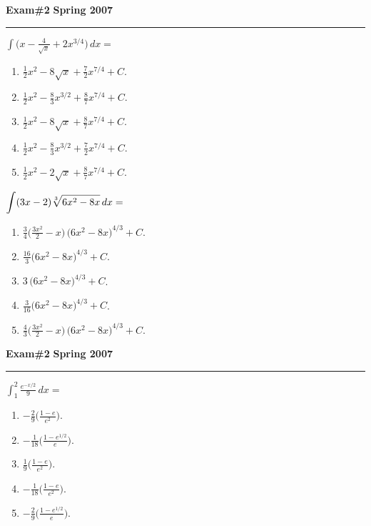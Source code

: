 \documentclass[12pt]{article}
\begin{document}
\hfill{\large\bf Exam\#2}\hfill{\large\bf
  Spring 2007}\hrule 
\bigskip

{\problem $\int \big( x - \frac{4}{\sqrt{x}} + 2x^{3/4}
    \big)\, dx = $} 
\begin{enumerate}
\item $\frac{1}{2}x^2 - 8\sqrt{x} + \frac{7}{2} x^{7/4} + C$.
\item $\frac{1}{2}x^2 - \frac{8}{3}x^{3/2} + \frac{8}{7} x^{7/4} + C$.
\item $\frac{1}{2}x^2 - 8\sqrt{x} + \frac{8}{7} x^{7/4} + C$.
\item $\frac{1}{2}x^2 - \frac{8}{3}x^{3/2} + \frac{7}{2} x^{7/4} + C$.
\item $\frac{1}{2}x^2 - 2\sqrt{x} + \frac{8}{7} x^{7/4} + C$.
\end{enumerate}
\vspace{5cm}

{\problem $\displaystyle{\int (3x-2)\root{3}\of{6x^2-8x}\, dx} = $}
\begin{enumerate}
\item $\displaystyle{\frac{3}{4} \Big( \frac{3x^2}{2}-x\Big)\, \big(
    6x^2-8x \big)^{4/3} + C}$. 
\item $\displaystyle{\frac{16}{3} \big( 6x^2-8x \big)^{4/3} + C}$. 
\item $\displaystyle{3 \, \big( 6x^2-8x \big)^{4/3} + C}$. 
\item $\displaystyle{\frac{3}{16} \big( 6x^2-8x \big)^{4/3} + C}$. 
\item $\displaystyle{\frac{4}{3} \Big( \frac{3x^2}{2}-x\Big)\, \big(
    6x^2-8x \big)^{4/3} + C}$. 
\end{enumerate}
\newpage

\hfill{\large\bf Exam\#2}\hfill{\large\bf
  Spring 2007}\hrule
\bigskip

{\problem $\displaystyle{\int_1^2 \frac{e^{-x/2}}{9}\, dx} =$}
\begin{enumerate}
\item $\displaystyle{-\frac{2}{9} \Big( \frac{1-e}{e^2} \Big)}$.
\item $\displaystyle{-\frac{1}{18} \Big( \frac{1-e^{1/2}}{e} \Big)}$.
\item $\displaystyle{\frac{1}{9} \Big( \frac{1-e}{e^2} \Big)}$.
\item $\displaystyle{-\frac{1}{18} \Big( \frac{1-e}{e^2} \Big)}$.
\item $\displaystyle{-\frac{2}{9} \Big( \frac{1-e^{1/2}}{e} \Big)}$.
\end{enumerate}
\vspace{4cm}
\end{document}
